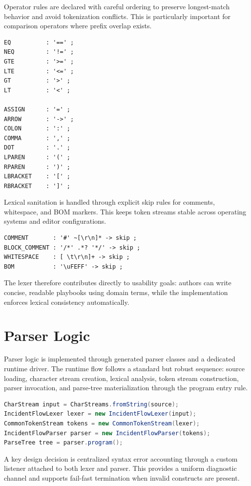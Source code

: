 Operator rules are declared with careful ordering to preserve longest-match behavior and avoid tokenization conflicts. This is particularly important for comparison operators where prefix overlap exists.

\begin{lstlisting}
EQ          : '==' ;
NEQ         : '!=' ;
GTE         : '>=' ;
LTE         : '<=' ;
GT          : '>' ;
LT          : '<' ;

ASSIGN      : '=' ;
ARROW       : '->' ;
COLON       : ':' ;
COMMA       : ',' ;
DOT         : '.' ;
LPAREN      : '(' ;
RPAREN      : ')' ;
LBRACKET    : '[' ;
RBRACKET    : ']' ;
\end{lstlisting}

Lexical sanitation is handled through explicit skip rules for comments, whitespace, and BOM markers. This keeps token streams stable across operating systems and editor configurations.

\begin{lstlisting}
COMMENT       : '#' ~[\r\n]* -> skip ;
BLOCK_COMMENT : '/*' .*? '*/' -> skip ;
WHITESPACE    : [ \t\r\n]+ -> skip ;
BOM           : '\uFEFF' -> skip ;
\end{lstlisting}

The lexer therefore contributes directly to usability goals: authors can write concise, readable playbooks using domain terms, while the implementation enforces lexical consistency automatically.

\section{Parser Logic}

Parser logic is implemented through generated parser classes and a dedicated runtime driver. The runtime flow follows a standard but robust sequence: source loading, character stream creation, lexical analysis, token stream construction, parser invocation, and parse-tree materialization through the program entry rule.

\begin{lstlisting}[language=Java]
CharStream input = CharStreams.fromString(source);
IncidentFlowLexer lexer = new IncidentFlowLexer(input);
CommonTokenStream tokens = new CommonTokenStream(lexer);
IncidentFlowParser parser = new IncidentFlowParser(tokens);
ParseTree tree = parser.program();
\end{lstlisting}

A key design decision is centralized syntax error accounting through a custom listener attached to both lexer and parser. This provides a uniform diagnostic channel and supports fail-fast termination when invalid constructs are present.


